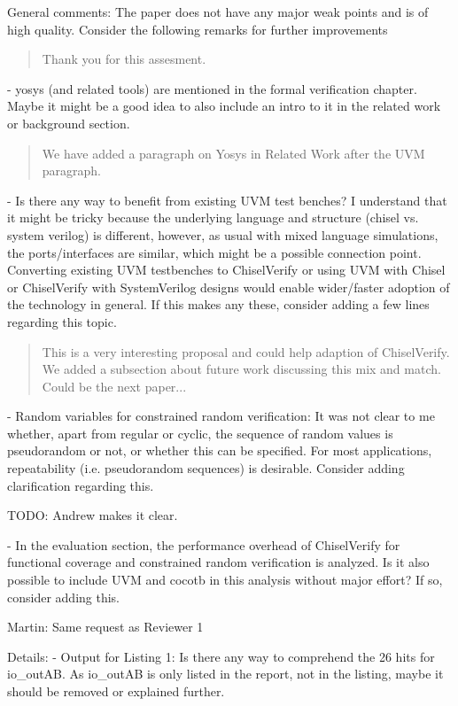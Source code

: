 \documentclass{article}
\newcommand{\todo}[1]{{\color{olive} TODO: #1}}
\newcommand{\martin}[1]{{\color{blue} Martin: #1\\}}
\newcommand{\reply}[1]{{\color{blue} #1}}
\begin{document}
General comments:
The paper does not have any major weak points and is of high quality. Consider the following remarks for further improvements

\begin{quote}
\reply{Thank you for this assesment.}
\end{quote}

- yosys (and related tools) are mentioned in the formal verification chapter. Maybe it might be a good idea to also include an intro to it in the related work or background section.

\begin{quote}
\reply{We have added a paragraph on Yosys in Related Work after the UVM paragraph.}
\end{quote}

- Is there any way to benefit from existing UVM test benches? I understand that it might be tricky because the underlying language and structure (chisel vs. system verilog) is different, however, as usual with mixed language simulations, the ports/interfaces are similar, which might be a possible connection point. Converting existing UVM testbenches to ChiselVerify or using UVM with Chisel or ChiselVerify with SystemVerilog designs would enable wider/faster adoption of the technology in general. If this makes any these, consider adding a few lines regarding this topic.

\begin{quote}
\reply{This is a very interesting proposal and could help adaption of ChiselVerify. We added a subsection about future work
discussing this mix and match. Could be the next paper...}
\end{quote}


- Random variables for constrained random verification: It was not clear to me whether, apart from regular or cyclic, the sequence of random values is pseudorandom or not, or whether this can be specified. For most applications, repeatability (i.e. pseudorandom sequences) is desirable. Consider adding clarification regarding this.

\todo{Andrew makes it clear.}

- In the evaluation section, the performance overhead of ChiselVerify for functional coverage and constrained random verification is analyzed. Is it also possible to include UVM and cocotb in this analysis without major effort? If so, consider adding this.

\martin{Same request as Reviewer 1}

Details:
- Output for Listing 1: Is there any way to comprehend the 26 hits for io\_outAB. As io\_outAB is only listed in the report, not in the listing, maybe it should be removed or explained further.
\end{document}
